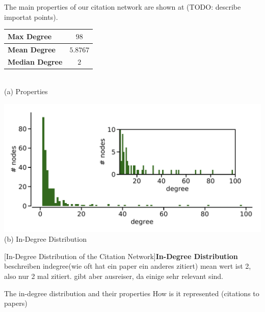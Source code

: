 The main properties of our citation network are shown at (TODO: describe importat points).

\begin{minipage}{\textwidth}
  \begin{minipage}[b]{0.39\textwidth}
    \centering
    \begin{tabular}{ l c }
      \toprule
      \textbf{Max Degree}    & $98$     \\ \midrule
      \textbf{Mean Degree}   & $5.8767$ \\ \midrule
      \textbf{Median Degree} & $2$      \\
      \bottomrule
  \end{tabular} \\
  \vspace*{1cm}
  (a) Properties
\end{minipage}
\begin{minipage}[b]{0.59\textwidth}
  \centering
  \includegraphics[width=1.0\textwidth]{figures/in-degree_distribution} \\
  (b) In-Degree Distribution
  \end{minipage}
  [In-Degree Distribution of the Citation Network]{\textbf{In-Degree Distribution} beschreiben indegree(wie oft hat ein paper ein anderes zitiert) mean wert ist 2, also nur 2 mal zitiert. gibt aber ausreiser, da einige sehr relevant sind.}
  \label{fig:indegree_distribution}
\end{minipage}

The in-degree distribution and their properties How is it represented (citations to papers)

